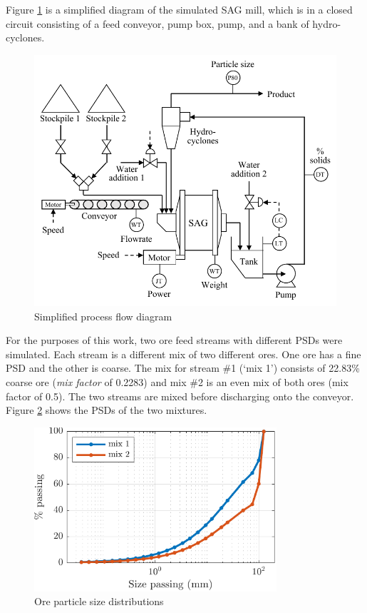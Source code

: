 {Figure \ref{fig:sag-diag} is a simplified diagram of the simulated \acrshort{SAG} mill, which is in a closed circuit consisting of a feed conveyor, pump box, pump, and a bank of hydro-cyclones.
\begin{figure}[ht]
	\centering
	\includegraphics[width=12.5cm]{images/sag-circuit-diag.pdf}
	\caption{Simplified process flow diagram}
	\label{fig:sag-diag}
\end{figure}
For the purposes of this work, two ore feed streams with different \gls{PSD}s were simulated. Each stream is a different mix of two different ores. One ore has a fine \gls{PSD} and the other is coarse. The mix for stream \#1 (`mix 1') consists of 22.83\% coarse ore (\textit{mix factor} of 0.2283) and mix \#2 is an even mix of both ores (mix factor of 0.5). The two streams are mixed before discharging onto the conveyor. Figure \ref{fig:coarse_fine_psd_plot} shows the \gls{PSD}s of the two mixtures.
\begin{figure}[ht]
	\centering
	\includegraphics[width=9cm]{images/coarse_fine_cumpsd_plot.pdf}
	\caption{Ore particle size distributions}
	\label{fig:coarse_fine_psd_plot}
\end{figure}

}
